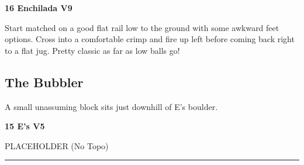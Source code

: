 \begin{multicols}{2}
					\begin{minipage}{\linewidth}	
					\label{rt:Enchilada}\colorbox{Goldenrod!50}{\textbf{16 Enchilada V9 \ding{72}   }}
					\begin{adjustwidth}{0.5cm}{}				
					Start matched on a good flat rail low to the ground with some awkward feet options. Cross into a comfortable crimp and fire up left before coming back right to a flat jug. Pretty classic as far as low balls go!
					\end{adjustwidth}
					\end{minipage}
			\subsection*{The Bubbler}\label{bf:The Bubbler}
			\begin{minipage}{\columnwidth}
			A small unassuming block sits just downhill of E's boulder.
			\end{minipage}
			
					\begin{minipage}{\linewidth}	
					\label{rt:E's}\colorbox{RoyalBlue!20}{\textbf{15 E's V5  }}
					\begin{adjustwidth}{0.5cm}{}				
					PLACEHOLDER
						\newline (No Topo) 
					\end{adjustwidth}
					\end{minipage}
\end{multicols}
\rule{\textwidth}{1pt}
